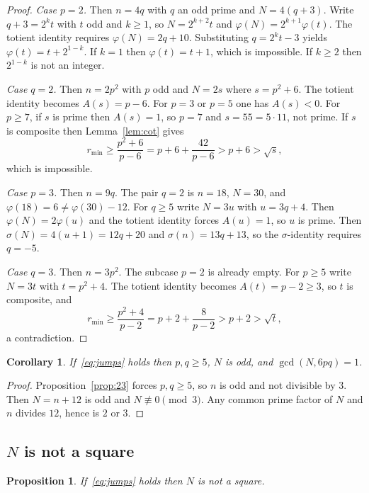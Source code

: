 \documentclass[11pt,reqno]{amsart}
\newcommand{\ph}{\varphi}
\newcommand{\sig}{\sigma}
\newtheorem{proposition}[theorem]{Proposition}
\newtheorem{corollary}[theorem]{Corollary}
\theoremstyle{definition}
\begin{document}
\begin{proof}
\textit{Case \(p=2\).}
Then \(n=4q\) with \(q\) an odd prime and \(N=4(q+3)\). Write \(q+3=2^kt\) with \(t\) odd and \(k\ge 1\), so \(N=2^{k+2}t\) and \(\ph(N)=2^{k+1}\ph(t)\). The totient identity requires \(\ph(N)=2q+10\). Substituting \(q=2^kt-3\) yields \(\ph(t)=t+2^{1-k}\). If \(k=1\) then \(\ph(t)=t+1\), which is impossible. If \(k\ge 2\) then \(2^{1-k}\) is not an integer.

\textit{Case \(q=2\).}
Then \(n=2p^2\) with \(p\) odd and \(N=2s\) where \(s=p^2+6\). The totient identity becomes \(A(s)=p-6\). For \(p=3\) or \(p=5\) one has \(A(s)<0\). For \(p\ge 7\), if \(s\) is prime then \(A(s)=1\), so \(p=7\) and \(s=55=5\cdot 11\), not prime. If \(s\) is composite then Lemma~\ref{lem:cot} gives
\[
r_{\min}\ge\frac{p^2+6}{p-6}=p+6+\frac{42}{p-6}>p+6>\sqrt{s},
\]
which is impossible.

\textit{Case \(p=3\).}
Then \(n=9q\). The pair \(q=2\) is \(n=18\), \(N=30\), and \(\ph(18)=6\neq\ph(30)-12\). For \(q\ge 5\) write \(N=3u\) with \(u=3q+4\). Then \(\ph(N)=2\ph(u)\) and the totient identity forces \(A(u)=1\), so \(u\) is prime. Then \(\sig(N)=4(u+1)=12q+20\) and \(\sig(n)=13q+13\), so the \(\sig\)-identity requires \(q=-5\).

\textit{Case \(q=3\).}
Then \(n=3p^2\). The subcase \(p=2\) is already empty. For \(p\ge 5\) write \(N=3t\) with \(t=p^2+4\). The totient identity becomes \(A(t)=p-2\ge 3\), so \(t\) is composite, and
\[
r_{\min}\ge\frac{p^2+4}{p-2}=p+2+\frac{8}{p-2}>p+2>\sqrt{t},
\]
a contradiction.
\end{proof}

\begin{corollary}
\label{cor:gcd}
If~\eqref{eq:jumps} holds then \(p,q\ge 5\), \(N\) is odd, and \(\gcd(N,6pq)=1\).
\end{corollary}

\begin{proof}
Proposition~\ref{prop:23} forces \(p,q\ge 5\), so \(n\) is odd and not divisible by \(3\). Then \(N=n+12\) is odd and \(N\not\equiv 0\pmod{3}\). Any common prime factor of \(N\) and \(n\) divides \(12\), hence is \(2\) or \(3\).
\end{proof}

\subsection{\(N\) is not a square}

\begin{proposition}
\label{prop:square}
If~\eqref{eq:jumps} holds then \(N\) is not a square.
\end{proposition}
\end{document}
